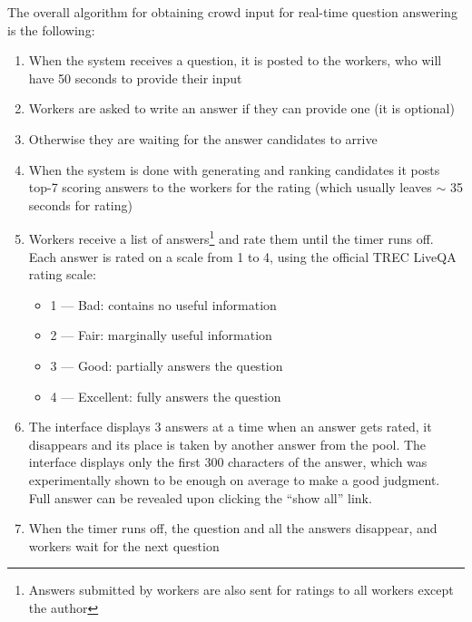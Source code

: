 The overall algorithm for obtaining crowd input for real-time question answering is the following:
\begin{enumerate}[itemsep=0em]
\item When the system receives a question, it is posted to the workers, who will have 50 seconds to provide their input
\item Workers are asked to write an answer if they can provide one (it is optional)
\item Otherwise they are waiting for the answer candidates to arrive
\item When the system is done with generating and ranking candidates it posts top-7 scoring answers to the workers for the rating (which usually leaves $\sim$ 35 seconds for rating)
\item Workers receive a list of answers\footnote{Answers submitted by workers are also sent for ratings to all workers except the author} and rate them until the timer runs off. Each answer is rated on a scale from 1 to 4, using the official TREC LiveQA rating scale:
    \begin{itemize}[itemsep=0em]
    \item 1 --- Bad: contains no useful information
    \item 2 --- Fair: marginally useful information
    \item 3 --- Good: partially answers the question
    \item 4 --- Excellent: fully answers the question
    \end{itemize}
\item The interface displays 3 answers at a time when an answer gets rated, it disappears and its place is taken by another answer from the pool. The interface displays only the first 300 characters of the answer, which was experimentally shown to be enough on average to make a good judgment.
Full answer can be revealed upon clicking the ``show all'' link.
\item When the timer runs off, the question and all the answers disappear, and workers wait for the next question
\end{enumerate}


